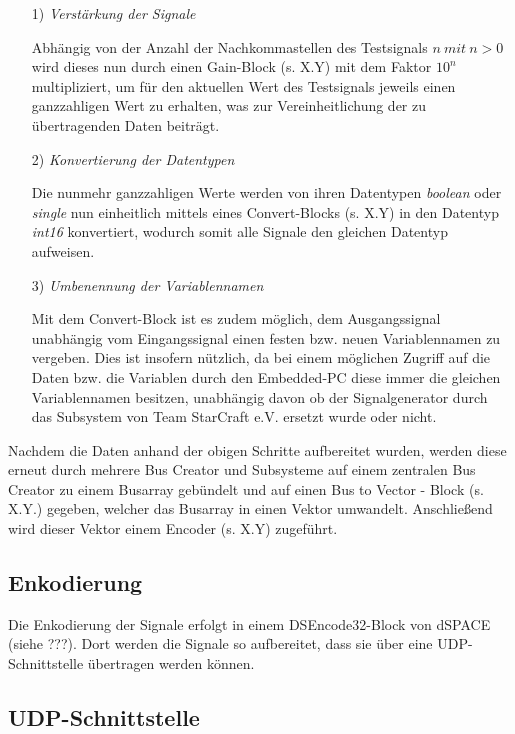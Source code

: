 \documentclass[fontsize = 12pt, paper = a4]{scrreprt}
\begin{document}
\begin{itemize}

\item[1)] \textit{Verstärkung der Signale}

Abhängig von der Anzahl der Nachkommastellen des Testsignals $n\ mit\ n>0$ wird dieses nun durch einen Gain-Block (s. X.Y) mit dem Faktor $10^n$ multipliziert, um für den aktuellen Wert des Testsignals jeweils einen ganzzahligen Wert zu erhalten, was zur Vereinheitlichung der zu übertragenden Daten beiträgt.

\item[2)] \textit{Konvertierung der Datentypen}

Die nunmehr ganzzahligen Werte werden von ihren Datentypen \textit{boolean} oder \textit{single} nun einheitlich mittels eines Convert-Blocks (s. X.Y) in den Datentyp \textit{int16} konvertiert, wodurch somit alle Signale den gleichen Datentyp aufweisen.  

\item[3)] \textit{Umbenennung der Variablennamen}

Mit dem Convert-Block ist es zudem möglich, dem Ausgangssignal unabhängig vom Eingangssignal einen festen bzw. neuen Variablennamen zu vergeben. Dies ist insofern nützlich, da bei einem möglichen Zugriff auf die Daten bzw. die Variablen durch den Embedded-PC diese immer die gleichen Variablennamen besitzen, unabhängig davon ob der Signalgenerator durch das Subsystem von Team StarCraft e.V. ersetzt wurde oder nicht.

\end{itemize}  

Nachdem die Daten anhand der obigen Schritte aufbereitet wurden, werden diese erneut durch mehrere Bus Creator und Subsysteme auf einem zentralen Bus Creator zu einem Busarray gebündelt und auf einen Bus to Vector - Block (s. X.Y.) gegeben, welcher das Busarray in einen Vektor umwandelt. Anschließend wird dieser Vektor einem Encoder (s. X.Y) zugeführt.

\subsection{Enkodierung}

Die Enkodierung der Signale erfolgt in einem DSEncode32-Block von dSPACE (siehe ???). Dort werden die Signale so aufbereitet, dass sie über eine UDP-Schnittstelle übertragen werden können. 

\subsection{UDP-Schnittstelle} 
\end{document}

